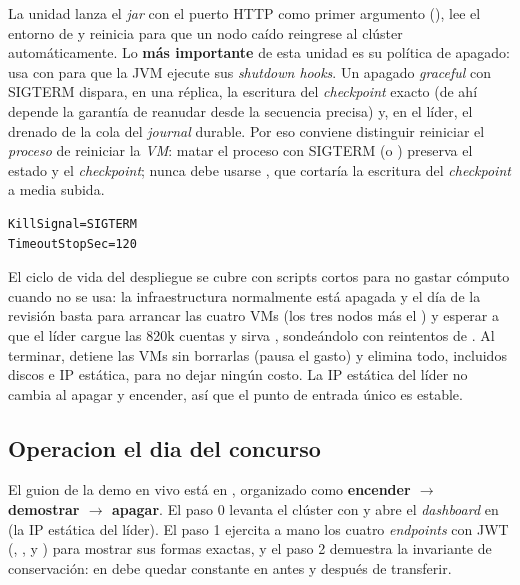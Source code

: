 La unidad  lanza el \emph{jar} con el puerto HTTP
como primer argumento (), lee el entorno de
 y reinicia  para que un nodo
caído reingrese al clúster automáticamente. Lo \textbf{más importante} de esta
unidad es su política de apagado: usa  con
 para que la JVM ejecute sus \emph{shutdown hooks}. Un
apagado \emph{graceful} con SIGTERM dispara, en una réplica, la escritura del
\emph{checkpoint} exacto (de ahí depende la garantía de reanudar desde la
secuencia precisa) y, en el líder, el drenado de la cola del \emph{journal}
durable. Por eso conviene distinguir reiniciar el \emph{proceso} de reiniciar la
\emph{VM}: matar el proceso con SIGTERM (o ) preserva el
estado y el \emph{checkpoint}; nunca debe usarse , que cortaría la
escritura del \emph{checkpoint} a media subida.

\begin{lstlisting}[language=none,caption={Apagado graceful que preserva el checkpoint (node.service, recortado)}]
KillSignal=SIGTERM
TimeoutStopSec=120
\end{lstlisting}

El ciclo de vida del despliegue se cubre con scripts cortos para no gastar
cómputo cuando no se usa: la infraestructura normalmente está apagada y el día de
la revisión basta  para arrancar las cuatro VMs (los
tres nodos más el ) y esperar a que el líder cargue las 820k
cuentas y sirva , sondeándolo con reintentos de .
Al terminar,  detiene las VMs sin borrarlas (pausa el
gasto) y  elimina todo, incluidos discos e IP
estática, para no dejar ningún costo. La IP estática del líder no cambia al
apagar y encender, así que el punto de entrada único es estable.

\subsection{Operacion el dia del concurso}

El guion de la demo en vivo está en , organizado como
\textbf{encender $\rightarrow$ demostrar $\rightarrow$ apagar}. El paso 0 levanta
el clúster con  y abre el \emph{dashboard} en
 (la IP estática del líder). El paso 1 ejercita
a mano los cuatro \emph{endpoints} con JWT (,
,  y
) para mostrar sus formas exactas, y el paso 2
demuestra la invariante de conservación:  en
 debe quedar constante en  antes y
después de transferir.

